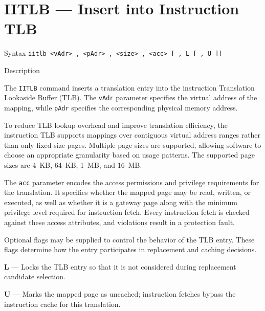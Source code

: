 %
%
\pagebreak
\section*{IITLB — Insert into Instruction TLB}

\begin{iPageDescEntry}{Syntax}
\texttt{iitlb <vAdr> , <pAdr> , <size> , <acc> [ , L [ , U ]]}
\end{iPageDescEntry}

\begin{iPageDescEntry}{Description}

The \texttt{IITLB} command inserts a translation entry into the instruction
Translation Lookaside Buffer (TLB). The \texttt{vAdr} parameter specifies the
virtual address of the mapping, while \texttt{pAdr} specifies the corresponding
physical memory address.

To reduce TLB lookup overhead and improve translation efficiency, the instruction
TLB supports mappings over contiguous virtual address ranges rather than only
fixed-size pages. Multiple page sizes are supported, allowing software to choose
an appropriate granularity based on usage patterns. The supported page sizes are
4~KB, 64~KB, 1~MB, and 16~MB.

The \texttt{acc} parameter encodes the access permissions and privilege
requirements for the translation. It specifies whether the mapped page may be read, written, or executed, as well as whether it is a gateway page along with the minimum privilege level required for instruction fetch. Every instruction fetch is checked against these access attributes, and violations result in a protection fault.

Optional flags may be supplied to control the behavior of the TLB entry. These
flags determine how the entry participates in replacement and caching decisions.

\begin{smallGapItemize}
  \item \textbf{L} — Locks the TLB entry so that it is not considered during
        replacement candidate selection.
  \item \textbf{U} — Marks the mapped page as uncached; instruction fetches bypass
        the instruction cache for this translation.
\end{smallGapItemize}

\end{iPageDescEntry}

